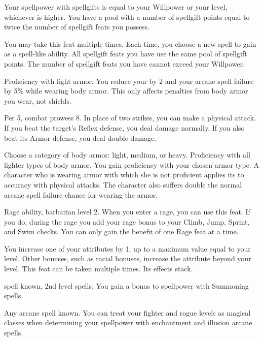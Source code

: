 Your spellpower with spellgifts is equal to your Willpower or your level, whichever is higher.
You have a pool with a number of spellgift points equal to twice the number of spellgift feats you possess.

You may take this feat multiple times.
Each time, you choose a new spell to gain as a spell-like ability.
All spellgift feats you have use the same pool of spellgift points.
The number of spellgift feats you have cannot exceed your Willpower.

\featpre Proficiency with light armor.
\featben You reduce your  by 2 and your arcane spell failure by 5\% while wearing body armor.
This only affects penalties from body armor you wear, not shields.

\featpre Per 5, combat prowess 8.
\featben In place of two strikes, you can make a physical attack.
If you beat the target's Reflex defense, you deal damage normally.
If you also beat its Armor defense, you deal double damage.

Choose a category of body armor: light, medium, or heavy.
\featpre Proficiency with all lighter types of body armor.
\featben You gain proficiency with your chosen armor type.
A character who is wearing armor with which she is not proficient applies its  to accuracy with physical attacks.
The character also suffers double the normal arcane spell failure chance for wearing the armor.

\featpre Rage ability, barbarian level 2.
\featben When you enter a rage, you can use this feat. If you do, during the rage you add your rage bonus to your Climb, Jump, Sprint, and Swim checks.
 You can only gain the benefit of one Rage feat at a time.

\featben You increase one of your attributes by 1, up to a maximum value equal to your level.
Other bonuses, such as racial bonuses, increase the attribute beyond your level.
 This feat can be taken multiple times. Its effects stack.

\featpre {} spell known, 2nd level spells.
\featben You gain a  bonus to spellpower with Summoning spells.

\featpre Any arcane spell known.
\featben You can treat your fighter and rogue levels as magical classes when determining your spellpower with enchantment and illusion arcane spells.

